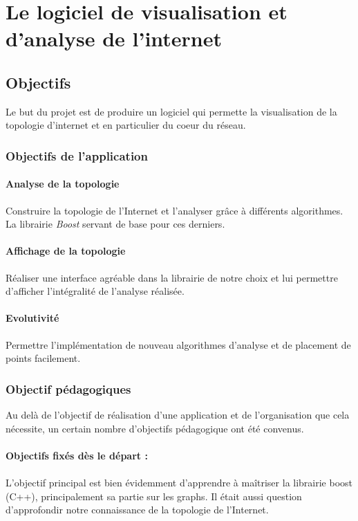 \section{Le logiciel de visualisation et d'analyse de l'internet}
\subsection{Objectifs}
Le but du projet est de produire un logiciel qui permette la visualisation de la topologie d'internet et en particulier du coeur du réseau.

\subsubsection{Objectifs de l'application}
\label{obj}
\paragraph{Analyse de la topologie}
Construire la topologie de l'Internet et l'analyser grâce à différents algorithmes. La librairie \textit{Boost} servant de base pour ces derniers.

\paragraph{Affichage de la topologie}
Réaliser une interface agréable dans la librairie de notre choix et lui permettre d'afficher l'intégralité de l'analyse réalisée.

\paragraph{Evolutivité}
Permettre l'implémentation de nouveau algorithmes d'analyse et de placement de points facilement.

\subsubsection{Objectif pédagogiques}
Au delà de l'objectif de réalisation d'une application et de l'organisation que cela nécessite, un certain nombre d'objectifs pédagogique ont été convenus.

\paragraph{Objectifs fixés dès le départ : } 
\paragraph{} L'objectif principal est bien évidemment d'apprendre à maîtriser la librairie boost (C++), principalement sa partie sur les graphs. Il était aussi question d'approfondir notre connaissance de la topologie de l'Internet.

